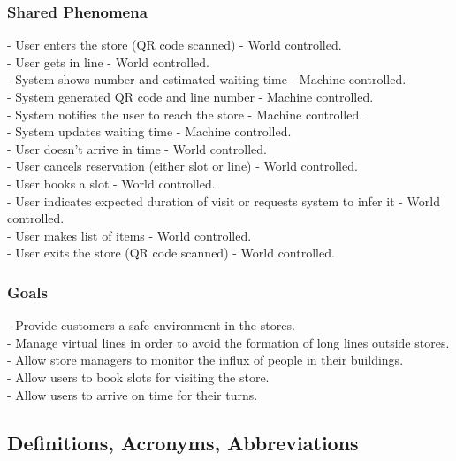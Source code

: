 \documentclass{article}
\begin{document}
\subsubsection{Shared Phenomena}
\noindent\medskip
[SP1] - User enters the store (QR code scanned) - World controlled.\\
\noindent\medskip
[SP2] - User gets in line - World controlled.\\
\noindent\medskip
[SP3] - System shows number and estimated waiting time - Machine controlled.\\
\noindent\medskip
[SP4] - System generated QR code and line number - Machine controlled.\\
\noindent\medskip
[SP5] - System notifies the user to reach the store - Machine controlled.\\
\noindent\medskip
[SP6] - System updates waiting time - Machine controlled.\\
\noindent\medskip
[SP7] - User doesn't arrive in time - World controlled.\\
\noindent\medskip
[SP8] - User cancels reservation (either slot or line) - World controlled.\\
\noindent\medskip
[SP9] - User books a slot - World controlled.\\
\noindent\medskip
[SP10] - User indicates expected duration of visit or requests system to infer it - World controlled.\\
\noindent\medskip
[SP11] - User makes list of items - World controlled.\\
\noindent\medskip
[SP12] - User exits the store (QR code scanned) - World controlled.\\
\subsubsection{Goals}
\noindent\medskip
[G1] - Provide customers a safe environment in the stores.\\
\noindent\medskip
[G2] - Manage virtual lines in order to avoid the formation of long lines outside stores.\\
\noindent\medskip
[G3] - Allow store managers to monitor the influx of people in their buildings.\\
\noindent\medskip
[G4] - Allow users to book slots for visiting the store.\\
\noindent\medskip
[G5] - Allow users to arrive on time for their turns.\\
\subsection{Definitions, Acronyms, Abbreviations}
\end{document}
